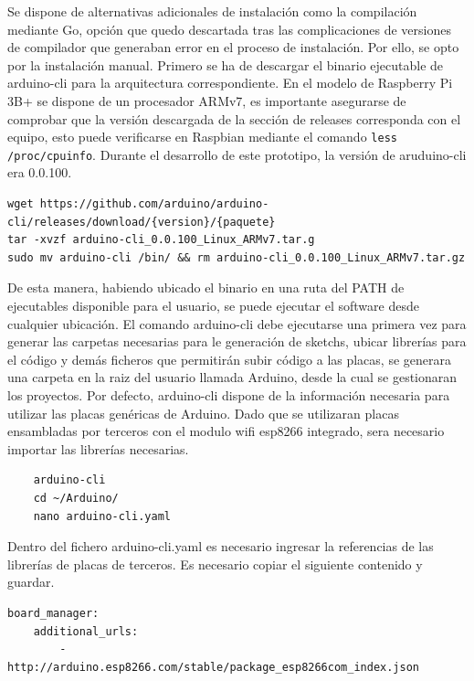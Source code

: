 \vspace{0.5cm}

Se dispone de alternativas adicionales de instalación como la compilación mediante Go, opción que quedo descartada tras las complicaciones de versiones de compilador que generaban error en el proceso de instalación. Por ello, se opto por la instalación manual. Primero se ha de descargar el binario ejecutable de arduino-cli para la arquitectura correspondiente. En el modelo de Raspberry Pi 3B+ se dispone de un procesador ARMv7, es importante asegurarse de comprobar que la versión descargada de la sección de releases corresponda con el equipo, esto puede verificarse en Raspbian mediante el comando \verb|less /proc/cpuinfo|. Durante el desarrollo de este prototipo, la versión de aruduino-cli era 0.0.100. 

\begin{verbatim}
wget https://github.com/arduino/arduino-cli/releases/download/{version}/{paquete}
tar -xvzf arduino-cli_0.0.100_Linux_ARMv7.tar.g
sudo mv arduino-cli /bin/ && rm arduino-cli_0.0.100_Linux_ARMv7.tar.gz
\end{verbatim}

De esta manera, habiendo ubicado el binario en una ruta del PATH de ejecutables disponible para el usuario, se puede ejecutar el software desde cualquier ubicación.
El comando arduino-cli debe ejecutarse una primera vez para generar las carpetas necesarias para le generación de sketchs, ubicar librerías para el código y demás ficheros que permitirán subir código a las placas, se generara una carpeta en la raiz del usuario llamada Arduino, desde la cual se gestionaran los proyectos. Por defecto, arduino-cli dispone de la información necesaria para utilizar las placas genéricas de Arduino. Dado que se utilizaran placas ensambladas por terceros con el modulo \gls{wifi} esp8266 integrado, sera necesario importar las librerías necesarias.

\begin{verbatim}
    arduino-cli
    cd ~/Arduino/
    nano arduino-cli.yaml
\end{verbatim}

Dentro del fichero arduino-cli.yaml es necesario ingresar la referencias de las librerías de placas de terceros. Es necesario copiar el siguiente contenido y guardar.
    
\begin{verbatim}
board_manager:
    additional_urls:
        - http://arduino.esp8266.com/stable/package_esp8266com_index.json
\end{verbatim}
    
